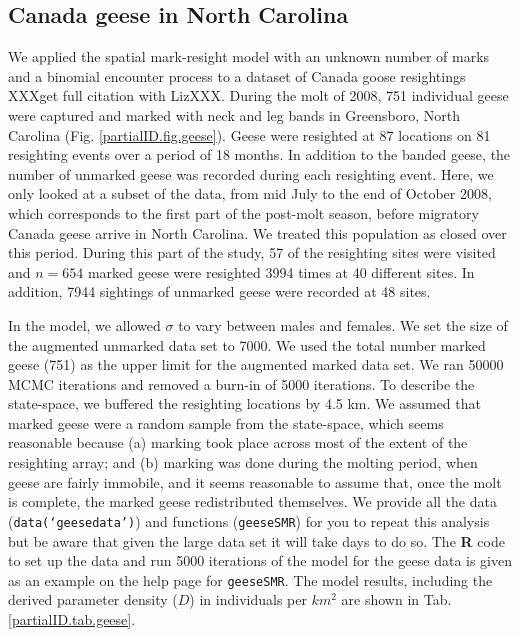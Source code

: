 \subsection{Canada geese in North Carolina}

We applied the spatial mark-resight model with an unknown number of
marks and a binomial encounter process to a dataset of Canada goose
resightings \citep{rutledge:2012} XXXget full citation with
LizXXX. During the molt of 2008, 751 individual geese were captured
and marked with neck and leg bands in Greensboro, North Carolina
(Fig. \ref{partialID.fig.geese}). Geese were resighted at 87
locations
on 81 resighting events over a period of 18 months. In addition to the
banded geese, the number of unmarked geese was recorded during each
resighting event. Here, we only looked at a subset of the data, from
mid July to the end of October 2008, which corresponds to the first
part of the post-molt season, before migratory Canada geese arrive in
North Carolina. We treated this population as closed over this period.
During this part of the study, 57 of the resighting sites were visited and $n = 654$ marked geese were resighted 3994 times at 40 different sites. In addition, 7944 sightings of unmarked geese were recorded at 48 sites.

In the model, we allowed $\sigma$ to vary between males and
females. We set the size of the augmented unmarked data set to 7000. We used the total number marked geese (751) as the upper limit for the augmented marked data set. We ran 50000 MCMC iterations and removed a burn-in of 5000 iterations. To describe the state-space, we buffered the resighting locations by 4.5 km. We assumed that marked geese were a random sample from the state-space, which seems reasonable because (a) marking took place across most of the extent of the resighting array; and (b) marking was done during the molting period, when geese are fairly immobile, and it seems reasonable to assume that, once the molt is complete, the marked geese redistributed themselves.
We provide all the data ({\tt data(`geesedata')}) and functions ({\tt geeseSMR}) for you to repeat this analysis but be aware that given the large data set it will take days to do so. The {\bf R} code to set up the data and run 5000 iterations of the model for the geese data is given as an example on the help page for {\tt geeseSMR}. The model results, including the derived parameter density ($D$) in individuals per $km^2$ are shown in Tab. \ref{partialID.tab.geese}.



